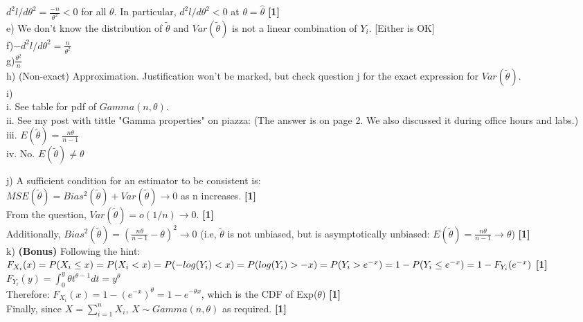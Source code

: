 \documentclass[20pt]{report}
\newcommand{\gt}{\theta}
\newcommand{\ttil}{\tilde{\theta}}
\begin{document}
$
d^2l/d\theta^2 = \frac{-n}{\theta^2} <0
$ for all $\theta$. In particular, $d^2l/d\theta^2 < 0$ at $\theta = \hat{\theta} $ \textbf{[1] }\\

e) We don't know the distribution of $\tilde{\theta} $ and
$Var(\tilde{\theta})$ is not a linear combination of $Y_i$. [Either is OK] \\

f)$
- d^2l/d\theta^2 = \frac{n}{\theta^2} 
$ \\

g)$
\frac{\theta^2}{n}
$ \\

h) (Non-exact) Approximation. Justification won't be marked, but check question j for the exact expression for $Var(\tilde{\theta})$. \\

i)\\ 

i. See table for pdf of $Gamma(n,\theta)$. \\

ii. See my post with tittle "Gamma properties" on piazza: (The answer is on page 2. We also discussed it during office hours and labs.)\\

iii. $E(\ttil) = \frac{n\gt}{n-1}$ \\

iv. No. $E(\ttil) \neq \theta $ \\

\pagebreak

j) A sufficient condition for an estimator to be consistent is: \\

$
MSE(\ttil) = Bias^2(\ttil) + Var(\ttil) \rightarrow 0
$ as n increases. \textbf{[1]} \\

From the question, $ Var(\ttil) = o(1/n) \rightarrow 0 $. \textbf{[1]} \\

Additionally, $ Bias^2(\ttil)= (\frac{n\gt}{n-1} - \theta)^2 \rightarrow 0 $ 
(i.e, $\ttil$ is not unbiased, but is asymptotically unbiased: $ E(\ttil) = \frac{n\gt}{n-1} \rightarrow \theta$) \textbf{[1]} \\

k) \textbf{(Bonus)} Following the hint: \\

$F_{X_i}(x) = P(X_i \leq x) = P (X_i < x) = P(-log(Y_i) < x) = P(log(Y_i) > -x) = 
P(Y_i > e^{-x}) = \\ 1 - P(Y_i \leq e^{-x}) = 1 - F_{Y_i} (e^{-x})$ \textbf{[1]} \\

$ F_{Y_i}(y) = \int_0^y \theta t^{\theta-1} dt =  y^\theta
$ \\

Therefore:
$ F_{X_i}(x) = 1 - (e^{-x}) ^\theta = 
1 - e^{-\theta x} $, which is the CDF of Exp($\theta$) \textbf{[1]} \\

Finally, since $X = \sum_{i=1}^n X_i$, $X \sim Gamma(n,\theta)$ as required. \textbf{[1]}
\end{document}
